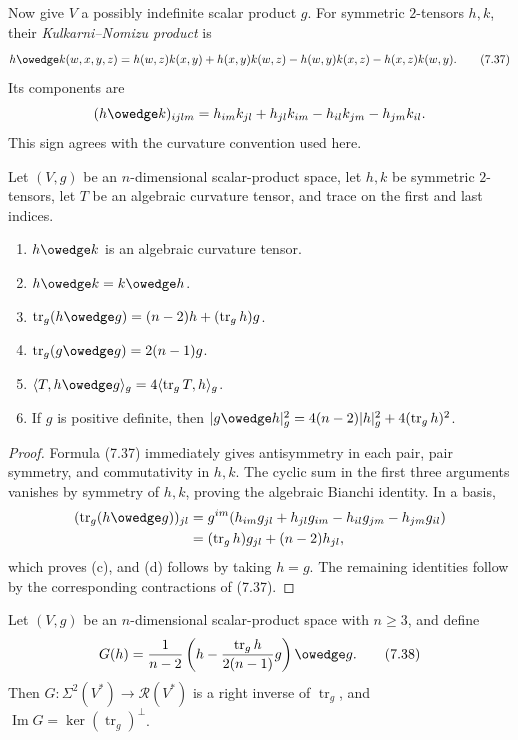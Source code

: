 Now give $V$ a possibly indefinite scalar product $g$.  For symmetric
$2$-tensors $h,k$, their \emph{Kulkarni--Nomizu product} is
\begin{equation}
h \owedge k(w,x,y,z) = h(w,z)k(x,y) + h(x,y)k(w,z)
{}- h(w,y)k(x,z) - h(x,z)k(w,y). \tag{7.37}
\end{equation}
Its components are
\[
(h\owedge k)_{ijlm}
=h_{im}k_{jl}+h_{jl}k_{im}-h_{il}k_{jm}-h_{jm}k_{il}.
\]
This sign agrees with the curvature convention used here.

\begin{lemma}
\label{lem:kulkarni-nomizu-properties}
Let $(V,g)$ be an $n$-dimensional scalar-product space, let $h,k$ be
symmetric $2$-tensors, let $T$ be an algebraic curvature tensor, and trace on
the first and last indices.
\begin{enumerate}
\item[(a)] $h\owedge k$ is an algebraic curvature tensor.
\item[(b)] $h\owedge k=k\owedge h$.
\item[(c)] $\operatorname{tr}_g(h\owedge g)
=(n-2)h+(\operatorname{tr}_gh)g$.
\item[(d)] $\operatorname{tr}_g(g\owedge g)=2(n-1)g$.
\item[(e)] $\langle T,h\owedge g\rangle_g
=4\langle\operatorname{tr}_gT,h\rangle_g$.
\item[(f)] If $g$ is positive definite, then
$|g\owedge h|_g^2=4(n-2)|h|_g^2+4(\operatorname{tr}_gh)^2$.
\end{enumerate}
\end{lemma}

\begin{proof}
\sketch
Formula (7.37) immediately gives antisymmetry in each pair, pair symmetry,
and commutativity in $h,k$.  The cyclic sum in the first three arguments
vanishes by symmetry of $h,k$, proving the algebraic Bianchi identity.  In a
basis,
\begin{align*}
(\operatorname{tr}_g(h\owedge g))_{jl}
&=g^{im}(h_{im}g_{jl}+h_{jl}g_{im}-h_{il}g_{jm}-h_{jm}g_{il})\\
&=(\operatorname{tr}_gh)g_{jl}+(n-2)h_{jl},
\end{align*}
which proves (c), and (d) follows by taking $h=g$.  The remaining identities
follow by the corresponding contractions of (7.37).
\end{proof}

\begin{proposition}
\label{prop:right-inverse-trace}
Let $(V,g)$ be an $n$-dimensional scalar-product space with $n\geq3$, and
define
\begin{equation}
G(h) = \frac{1}{n-2}\left(h - \frac{\operatorname{tr}_g h}{2(n-1)}g\right)
\owedge g. \tag{7.38}
\end{equation}
Then $G:\Sigma^2(V^*)\to\mathscr R(V^*)$ is a right inverse of
$\operatorname{tr}_g$, and
$\operatorname{Im}G=\ker(\operatorname{tr}_g)^\perp$.
\end{proposition}

